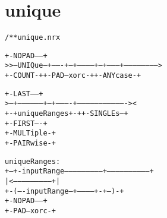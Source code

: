 \section{unique}
\begin{shaded}
\begin{alltt}
/** unique.nrx

                          +-NOPAD-----+
   >>--UNIQue--+-------+--+-----------+--+---------+----------------------->
               +-COUNT-+  +-PAD--xorc-+  +-ANYcase-+

                            +-LAST-----+
   >--+------------------+--+----------+----------------------------------><
      +-+ uniqueRanges +-+  +-SINGLEs--+
                            +-FIRST----+
                            +-MULTiple-+
                            +-PAIRwise-+

   uniqueRanges:
   +--+-inputRange--------------------------+------------------------------+
      |    <---------------------------+    |
      +-(----inputRange--+-----------+-+--)-+
                         +-NOPAD-----+
                         +-PAD--xorc-+

\end{alltt}
\end{shaded}

